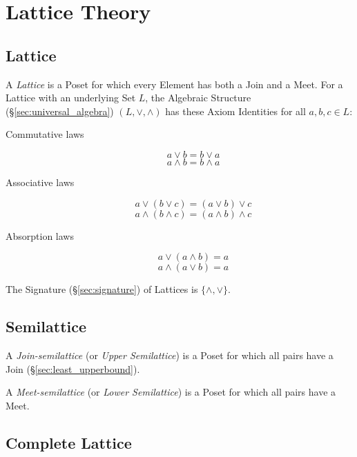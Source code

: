 \section{Lattice Theory}\label{sec:lattice_theory}

\subsection{Lattice}\label{sec:lattice}

A \emph{Lattice} is a Poset for which every Element has both a Join
and a Meet. For a Lattice with an underlying Set $L$, the Algebraic
Structure (\S\ref{sec:universal_algebra}) $(L, \vee, \wedge)$ has
these Axiom Identities for all $a,b,c \in L$:
\begin{description}
\item[Commutative laws]
\[
    a \vee b = b \vee a
\] \[
    a \wedge b = b \wedge a
\]
\item[Associative laws]
\[
    a \vee (b \vee c) = (a \vee b) \vee c
\] \[
    a \wedge (b \wedge c) = (a \wedge b) \wedge c
\]
\item[Absorption laws]
\[
    a \vee (a \wedge b) = a
\] \[
    a \wedge (a \vee b) = a
\]
\end{description}
The Signature (\S\ref{sec:signature}) of Lattices is
$\{\wedge, \vee\}$.



\subsection{Semilattice}\label{sec:semilattice}

A \emph{Join-semilattice} (or \emph{Upper Semilattice}) is a Poset for
which all pairs have a Join (\S\ref{sec:least_upperbound}).

A \emph{Meet-semilattice} (or \emph{Lower Semilattice}) is a Poset for
which all pairs have a Meet.



\subsection{Complete Lattice}\label{sec:complete_lattice}

